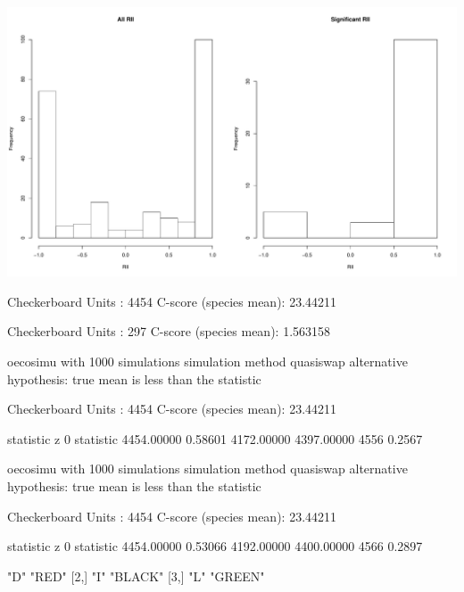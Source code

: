 \documentclass[12pt]{article}
\begin{document}
\includegraphics{O_cornuta_ms-004}

\begin{Schunk}
\begin{Soutput}
Checkerboard Units    : 4454 
C-score (species mean): 23.44211 
\end{Soutput}
\begin{Soutput}
Checkerboard Units    : 297 
C-score (species mean): 1.563158 
\end{Soutput}
\begin{Soutput}
oecosimu with 1000 simulations
simulation method quasiswap
alternative hypothesis: true mean is less than the statistic

Checkerboard Units    : 4454 
C-score (species mean): 23.44211 

           statistic          z         0%
statistic 4454.00000    0.58601 4172.00000 4397.00000 4556   0.2567
\end{Soutput}
\begin{Soutput}
oecosimu with 1000 simulations
simulation method quasiswap
alternative hypothesis: true mean is less than the statistic

Checkerboard Units    : 4454 
C-score (species mean): 23.44211 

           statistic          z         0%
statistic 4454.00000    0.53066 4192.00000 4400.00000 4566   0.2897
\end{Soutput}
\begin{Soutput}
     [,1] [,2]   
[1,] "D"  "RED"  
[2,] "I"  "BLACK"
[3,] "L"  "GREEN"
\end{Soutput}
\end{Schunk}
\end{document}
